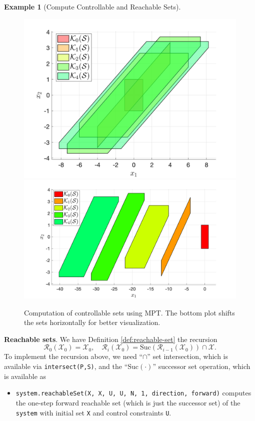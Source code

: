 \documentclass[
]{book}
\providecommand{\tightlist}{%
  \setlength{\itemsep}{0pt}\setlength{\parskip}{0pt}}
\theoremstyle{definition}
\theoremstyle{definition}
\newtheorem{example}{Example}[chapter]
\theoremstyle{definition}
\theoremstyle{definition}
\theoremstyle{remark}
\begin{document}
\begin{example}[Compute Controllable and Reachable Sets]
\begin{figure}
{\centering \includegraphics[width=0.6\linewidth]{images/controllable_set_overlap} \includegraphics[width=0.6\linewidth]{images/controllable_set_shift} 

}

\caption{Computation of controllable sets using MPT. The bottom plot shifts the sets horizontally for better visualization.}\label{fig:controllable-set-example}
\end{figure}

\textbf{Reachable sets}. We have Definition \ref{def:reachable-set} the recursion
\[
\mathcal{R}_0(\mathcal{X}_0) = \mathcal{X}_0, \quad \mathcal{R}_i(\mathcal{X}_0) = \text{Suc}(\mathcal{R}_{i-1}(\mathcal{X}_0)) \cap \mathcal{X}.
\]
To implement the recursion above, we need ``\(\cap\)'' set intersection, which is available via \texttt{intersect(P,S)}, and the ``\(\text{Suc}(\cdot)\)'' successor set operation, which is available as

\begin{itemize}
\tightlist
\item
  \texttt{system.reachableSet(\textquotesingle{}X\textquotesingle{},\ X,\ \textquotesingle{}U\textquotesingle{},\ U,\ \textquotesingle{}N\textquotesingle{},\ 1,\ \textquotesingle{}direction\textquotesingle{},\ \textquotesingle{}forward\textquotesingle{})} computes the one-step forward reachable set (which is just the successor set) of the \texttt{system} with initial set \texttt{X} and control constraints \texttt{U}.
\end{itemize}


\end{example}
\end{document}
